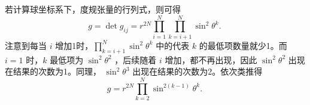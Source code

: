 若计算球坐标系下，度规张量的行列式，则可得
\begin{equation}
g=\det{g_{ij}}=r^{2N}\prod_{i=1}^N\prod\limits_{k=i+1}^{N}\sin^2\theta^{k}.~
\end{equation}
注意到每当 $i$ 增加1时，$\prod\limits_{k=i+1}^{N}\sin^2\theta^{k}$ 中的代表 $k$ 的最低项数量就少1。而 $i=1$ 时，$k$ 最低项为 $\sin ^2\theta^2$ ，后续随着 $i$ 增加，都不再出现，因此 $\sin ^2\theta^2$ 出现在结果的次数为1。同理， $\sin ^2\theta^3$ 出现在结果的次数为2。依次类推得
\begin{equation}
g=r^{2N}\prod\limits_{k=2}^{N}\sin^{2(k-1)}\theta^{k}.~
\end{equation}


























